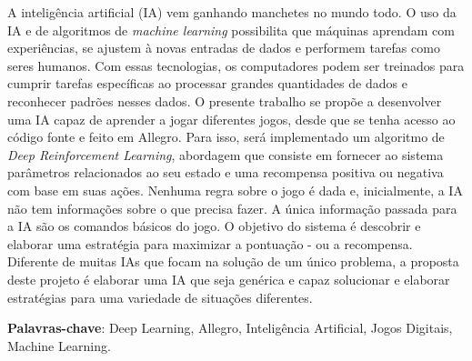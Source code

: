 
\setlength{\absparsep}{18pt} %
\begin{resumo}
 A inteligência artificial (IA) vem ganhando manchetes no mundo todo.
 O uso da IA e de algoritmos de \textit{machine learning}  possibilita que máquinas aprendam com experiências, se ajustem à novas entradas de dados e performem tarefas como seres humanos. Com essas tecnologias, os computadores podem ser treinados para cumprir tarefas específicas ao processar grandes quantidades de dados e reconhecer padrões nesses dados. \cite{pln-o-que-e}
O presente trabalho se propõe a desenvolver uma IA capaz de aprender a jogar diferentes jogos, desde que se tenha acesso ao código fonte e feito em Allegro. Para isso, será implementado um algoritmo de \textit{Deep Reinforcement Learning}, abordagem que consiste em fornecer ao sistema parâmetros relacionados ao seu estado e uma recompensa positiva ou negativa com base em suas ações. Nenhuma regra sobre o jogo é dada e, inicialmente, a IA não tem informações sobre o que precisa fazer. A única informação passada para a IA são os comandos básicos do jogo. O objetivo do sistema é descobrir e elaborar uma estratégia para maximizar a pontuação - ou a recompensa. Diferente de muitas IAs que focam na solução de um único problema, a proposta deste projeto é elaborar uma IA que seja genérica e capaz solucionar e elaborar estratégias para uma variedade de situações diferentes.
 

 \textbf{Palavras-chave}: Deep Learning, Allegro, Inteligência Artificial, Jogos Digitais, Machine Learning.
\end{resumo}


